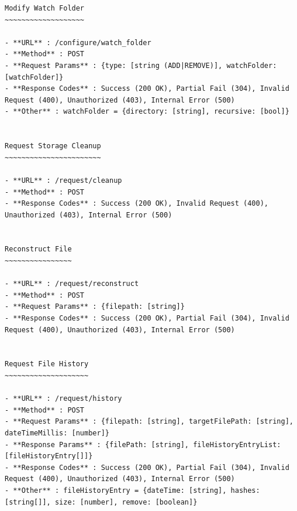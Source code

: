 \documentclass[11pt, a4paper, twoside]{report}
\begin{document}
\begin{lstlisting}[language=RsT, caption=Membrane API Documentation, label=lst:apiDocs]
Modify Watch Folder
~~~~~~~~~~~~~~~~~~~

- **URL** : /configure/watch_folder
- **Method** : POST
- **Request Params** : {type: [string (ADD|REMOVE)], watchFolder: [watchFolder]}
- **Response Codes** : Success (200 OK), Partial Fail (304), Invalid Request (400), Unauthorized (403), Internal Error (500)
- **Other** : watchFolder = {directory: [string], recursive: [bool]}


Request Storage Cleanup
~~~~~~~~~~~~~~~~~~~~~~~

- **URL** : /request/cleanup
- **Method** : POST
- **Response Codes** : Success (200 OK), Invalid Request (400), Unauthorized (403), Internal Error (500)


Reconstruct File
~~~~~~~~~~~~~~~~

- **URL** : /request/reconstruct
- **Method** : POST
- **Request Params** : {filepath: [string]}
- **Response Codes** : Success (200 OK), Partial Fail (304), Invalid Request (400), Unauthorized (403), Internal Error (500)


Request File History
~~~~~~~~~~~~~~~~~~~~

- **URL** : /request/history
- **Method** : POST
- **Request Params** : {filepath: [string], targetFilePath: [string], dateTimeMillis: [number]}
- **Response Params** : {filePath: [string], fileHistoryEntryList: [fileHistoryEntry[]]}
- **Response Codes** : Success (200 OK), Partial Fail (304), Invalid Request (400), Unauthorized (403), Internal Error (500)
- **Other** : fileHistoryEntry = {dateTime: [string], hashes: [string[]], size: [number], remove: [boolean]}
\end{lstlisting}
\end{document}

